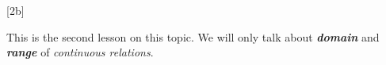\documentclass[letterpaper]{memoir}
\begin{document}
\pagestyle{myPagestyle}
\checkandfixthelayout
\raggedbottom






\renewcommand{\thechapter}{1} 
\renewcommand{\myCurrentChapterTitle}{Introduction to Functions}

[2b]

This is the second lesson on this topic.
We will only talk about {\bfseries\itshape domain} and {\bfseries\itshape range} 
of \emph{continuous relations}.



\end{document}

